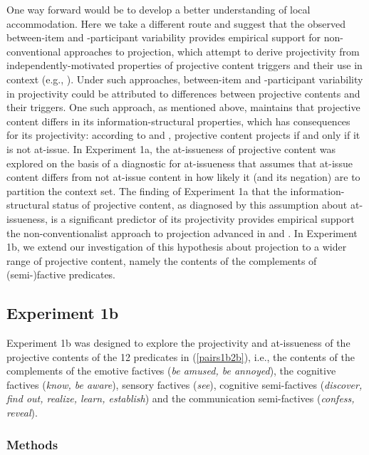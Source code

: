 \documentclass[11pt,fleqn]{article}
\newcommand{\6}{\mbox{$[\hspace*{-.6mm}[$}}
\newcommand{\9}{\mbox{$]\hspace*{-.6mm}]$}}
\begin{document}
One way forward would be to develop a better understanding of local accommodation. Here we take a different route and suggest that the observed between-item and -participant variability provides empirical support for non-conventional approaches to projection, which attempt to derive projectivity from independently-motivated properties of projective content triggers and their use in context (e.g., \citealt{stalnaker74,kempson75,wilson75,boer-lycan76,levinson83,kadmon01,simons01,simons04,atlas05,abusch10,abrusan2011,best-question}). Under such approaches, between-item and -participant variability in projectivity could be attributed to differences between projective contents and their triggers. One such approach, as mentioned above, maintains that projective content differs in its information-structural properties, which has consequences for its projectivity: according to \citealt{brst-salt10} and \citealt{brst-ar}, projective content projects if and only if it is not at-issue. In Experiment 1a, the at-issueness of projective content was explored on the basis of a diagnostic for at-issueness that assumes that at-issue content differs from not at-issue content in how likely it (and its negation) are to partition the context set. The finding of Experiment 1a that the information-structural status of projective content, as diagnosed by this assumption about at-issueness, is a significant predictor of its projectivity provides empirical support the non-conventionalist approach to projection advanced in \citealt{brst-salt10} and \citealt{brst-ar}. In Experiment 1b, we extend our investigation of this hypothesis about projection to a wider range of projective content, namely the contents of the complements of (semi-)factive predicates.


\subsection{Experiment 1b}\label{s-exp1b} 

Experiment 1b was designed to explore the projectivity and at-issueness of the projective contents of the 12 predicates in (\ref{pairs1b2b}), i.e., the contents of the complements of the emotive factives ({\em be amused, be annoyed}), the cognitive factives ({\em know, be aware}), sensory factives ({\em see}), cognitive semi-factives ({\em discover, find out, realize, learn, establish}) and the communication semi-factives ({\em confess, reveal}).

\subsubsection{Methods}
\end{document}
